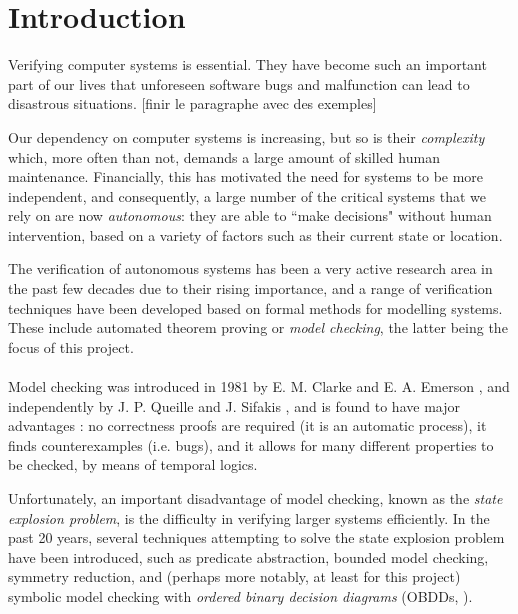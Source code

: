\documentclass[11pt]{article}
\begin{document}
\tableofcontents
\clearpage
\begin{abstract}

\end{abstract}

\section{Introduction}

Verifying computer systems is essential. They have become such an important part of our lives that unforeseen software bugs and malfunction can lead to disastrous situations. [finir le paragraphe avec des exemples] 

Our dependency on computer systems is increasing, but so is their \textit{complexity} which, more often than not, demands a large amount of skilled human maintenance. Financially, this has motivated the need for systems to be more independent, and consequently, a large number of the critical systems that we rely on are now \textit{autonomous}: they are able to ``make decisions" without human intervention, based on a variety of factors such as their current state or location. 

The verification of autonomous systems has been a very active research area in the past few decades due to their rising importance, and a range of verification techniques have been developed based on formal methods for modelling systems. These include automated theorem proving or \textit{model checking}, the latter being the focus of this project.
\\\\

 Model checking was introduced in 1981 by E. M. Clarke and E. A. Emerson \cite{original_model_checking}, and independently by J. P. Queille and J. Sifakis \cite{symbolic_model_checking}, and is found to have major advantages \cite{birth_of_model_checking}: no correctness proofs are required (it is an automatic process), it finds counterexamples (i.e. bugs), and it allows for many different properties to be checked, by means of temporal logics. 
 
Unfortunately, an important disadvantage of model checking, known as the \textit{state explosion problem}, is the difficulty in verifying larger systems efficiently. In the past 20 years, several techniques attempting to solve the state explosion problem have been introduced, such as predicate abstraction, bounded model checking, symmetry reduction, and (perhaps more notably, at least for this project) symbolic model checking with \textit{ordered binary decision diagrams} (OBDDs, \cite{bryant}).
\end{document}
